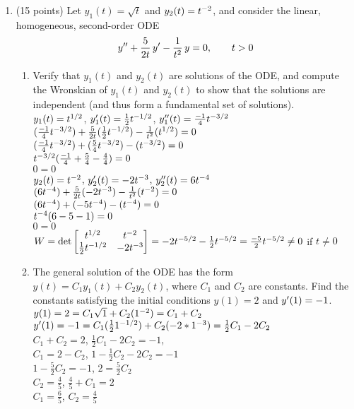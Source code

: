 \documentclass{article}
\begin{document}
\begin{enumerate}
\bigskip
\item (15 points) Let $y_1(t)=\sqrt{t}$ and $y_2(t)=t\sp{-2}$, and consider the linear, homogeneous, second-order ODE
\[
y\sp{\prime\prime}+{5\over2t}\,y\sp\prime-{1\over t\sp2}\,y=0,\qquad t>0
\]
\begin{enumerate}
\item
Verify that $y_1(t)$ and $y_2(t)$ are solutions of the ODE, and compute the Wronskian of $y_1(t)$ and $y_2(t)$ to show that the solutions are independent (and thus form a fundamental set of solutions).
\\$y_1(t)=t\sp{1/2}$, $y_1'(t)=\frac{1}{2}t\sp{-1/2}$, $y_1''(t)=\frac{-1}{4}t\sp{-3/2}$
\\$(\frac{-1}{4}t\sp{-3/2})+\frac{5}{2t}(\frac{1}{2}t\sp{-1/2})-\frac{1}{t^2}(t\sp{1/2})=0$
\\$(\frac{-1}{4}t\sp{-3/2})+(\frac{5}{4}t\sp{-3/2})-(t\sp{-3/2})=0$
\\$t\sp{-3/2}(\frac{-1}{4}+\frac{5}{4}-\frac{4}{4})=0$
\\$0=0$
\\$y_2(t)=t\sp{-2}$, $y_2'(t)=-2t\sp{-3}$, $y_2''(t)=6t\sp{-4}$
\\$(6t\sp{-4})+\frac{5}{2t}(-2t\sp{-3})-\frac{1}{t^2}(t\sp{-2})=0$
\\$(6t\sp{-4})+(-5t\sp{-4})-(t\sp{-4})=0$
\\$t\sp{-4}(6-5-1)=0$
\\$0=0$
\\ 
$W=\det\begin{bmatrix}t\sp{1/2} & t\sp{-2}\\\frac{1}{2}t\sp{-1/2} & -2t\sp{-3}\end{bmatrix}=-2t\sp{-5/2}-\frac{1}{2}t\sp{-5/2}=\frac{-5}{2}t\sp{-5/2}\neq0$ if $t\neq0$
\item
The general solution of the ODE has the form $y(t)=C_1y_1(t)+C_2y_2(t)$, where $C_1$ and $C_2$ are constants.  Find the constants satisfying the initial conditions $y(1)=2$ and $y\sp\prime(1)=-1$.
\\$y(1)=2=C_1\sqrt{1}+C_2(1\sp{-2})=C_1+C_2$
\\$y'(1)=-1=C_1(\frac{1}{2}1\sp{-1/2})+C_2(-2*1\sp{-3})=\frac{1}{2}C_1-2C_2$
\\$C_1+C_2=2$, $\frac{1}{2}C_1-2C_2=-1$, 
\\$C_1=2-C_2$, $1-\frac{1}{2}C_2-2C_2=-1$
\\$1-\frac{5}{2}C_2=-1$, $2=\frac{5}{2}C_2$
\\$C_2=\frac{4}{5}$, $\frac{4}{5}+C_1=2$
\\$C_1=\frac{6}{5}$, $C_2=\frac{4}{5}$




\end{enumerate}
\end{enumerate}
\end{document}
